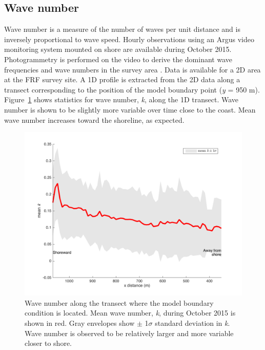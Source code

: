 \subsection{Wave number}
\label{datak}
Wave number is a measure of the number of waves per unit distance and is inversely proportional to wave speed. Hourly observations  using an Argus video monitoring system mounted on shore are available during October 2015. Photogrammetry is performed on the video to derive the dominant wave frequencies and wave numbers in the survey area \citep{holman2013}. Data is available for a 2D area at the FRF survey site. A 1D profile is extracted from the 2D data along a transect corresponding to the position of the model boundary point (\textit{y} = 950 m). Figure~\ref{k1Dmean} shows statistics for wave number, \textit{k}, along the 1D transect. Wave number is shown to be slightly more variable over time close to the coast. Mean wave number increases toward the shoreline, as expected.



\begin{figure}[H]
\centering
\includegraphics[width=.55\linewidth]{img/k1Dmean_std.png}
\caption{Wave number along the transect where the model boundary condition is located. Mean wave number, \textit{k}, during October 2015 is shown in red. Gray envelopes show $\pm$ 1$\sigma$ standard deviation in \textit{k}. Wave number is observed to be relatively larger and more variable closer to shore.}
\label{k1Dmean}
\end{figure}
